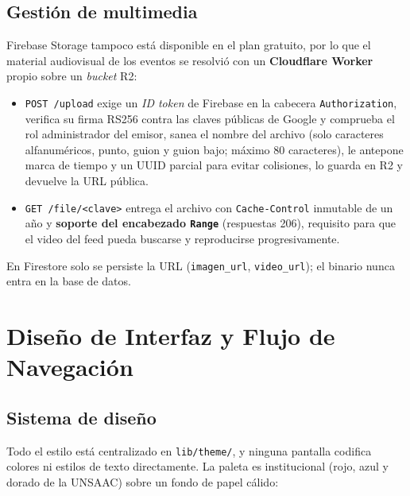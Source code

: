 \documentclass[12pt,a4paper]{article}
\begin{document}
\subsection{Gestión de multimedia}
Firebase Storage tampoco está disponible en el plan gratuito, por lo que el material audiovisual de los eventos se resolvió con un \textbf{Cloudflare Worker} propio sobre un \emph{bucket} R2:

\begin{itemize}
    \item \texttt{POST /upload} exige un \emph{ID token} de Firebase en la cabecera \texttt{Authorization}, verifica su firma RS256 contra las claves públicas de Google y comprueba el rol administrador del emisor, sanea el nombre del archivo (solo caracteres alfanuméricos, punto, guion y guion bajo; máximo 80 caracteres), le antepone marca de tiempo y un UUID parcial para evitar colisiones, lo guarda en R2 y devuelve la URL pública.
    \item \texttt{GET /file/<clave>} entrega el archivo con \texttt{Cache-Control} inmutable de un año y \textbf{soporte del encabezado \texttt{Range}} (respuestas 206), requisito para que el video del feed pueda buscarse y reproducirse progresivamente.
\end{itemize}

En Firestore solo se persiste la URL (\texttt{imagen\_url}, \texttt{video\_url}); el binario nunca entra en la base de datos.

\newpage
\section{Diseño de Interfaz y Flujo de Navegación}

\subsection{Sistema de diseño}
Todo el estilo está centralizado en \texttt{lib/theme/}, y ninguna pantalla codifica colores ni estilos de texto directamente. La paleta es institucional (rojo, azul y dorado de la UNSAAC) sobre un fondo de papel cálido:
\end{document}
